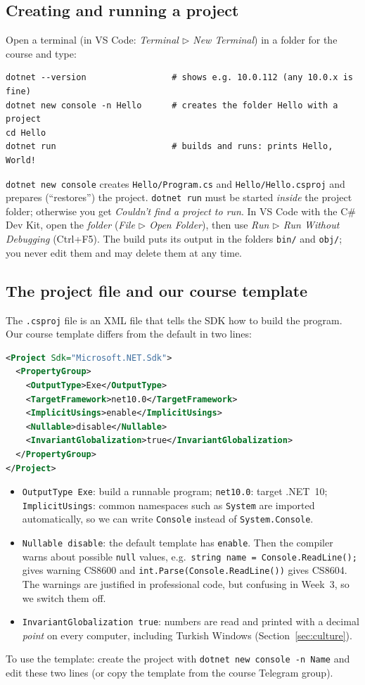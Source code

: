 \subsection{Creating and running a project}
Open a terminal (in VS Code: \emph{Terminal $\triangleright$ New Terminal}) in a folder for the course and type:
\begin{lstlisting}[style=shell]
dotnet --version                 # shows e.g. 10.0.112 (any 10.0.x is fine)
dotnet new console -n Hello      # creates the folder Hello with a project
cd Hello
dotnet run                       # builds and runs: prints Hello, World!
\end{lstlisting}
\texttt{dotnet new console} creates \texttt{Hello/Program.cs} and \texttt{Hello/Hello.csproj} and prepares (``restores'') the project. \texttt{dotnet run} must be started \emph{inside} the project folder; otherwise you get \emph{Couldn't find a project to run}. In VS Code with the C\# Dev Kit, open the \emph{folder} (\emph{File $\triangleright$ Open Folder}), then use \emph{Run $\triangleright$ Run Without Debugging} (Ctrl+F5). The build puts its output in the folders \texttt{bin/} and \texttt{obj/}; you never edit them and may delete them at any time.

\subsection{The project file and our course template}
The \texttt{.csproj} file is an XML file that tells the SDK how to build the program. Our course template differs from the default in two lines:
\begin{lstlisting}[language=XML,numbers=none]
<Project Sdk="Microsoft.NET.Sdk">
  <PropertyGroup>
    <OutputType>Exe</OutputType>
    <TargetFramework>net10.0</TargetFramework>
    <ImplicitUsings>enable</ImplicitUsings>
    <Nullable>disable</Nullable>
    <InvariantGlobalization>true</InvariantGlobalization>
  </PropertyGroup>
</Project>
\end{lstlisting}
\begin{itemize}[leftmargin=*,itemsep=1pt]
  \item \texttt{OutputType Exe}: build a runnable program; \texttt{net10.0}: target .NET~10; \texttt{ImplicitUsings}: common namespaces such as \texttt{System} are imported automatically, so we can write \texttt{Console} instead of \texttt{System.Console}.
  \item \texttt{Nullable disable}: the default template has \texttt{enable}. Then the compiler warns about possible \texttt{null} values, e.g.\ \texttt{string name = Console.ReadLine();} gives warning CS8600 and \texttt{int.Parse(Console.ReadLine())} gives CS8604. The warnings are justified in professional code, but confusing in Week~3, so we switch them off.
  \item \texttt{InvariantGlobalization true}: numbers are read and printed with a decimal \emph{point} on every computer, including Turkish Windows (Section~\ref{sec:culture}).
\end{itemize}
To use the template: create the project with \texttt{dotnet new console -n Name} and edit these two lines (or copy the template from the course Telegram group).

